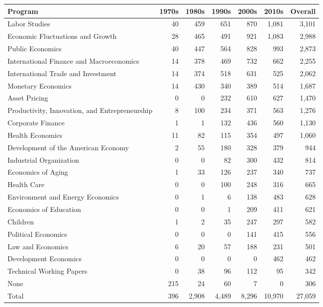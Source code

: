
\begin{tabular}{lrrrrrr}
\toprule
Program & 1970s & 1980s & 1990s & 2000s & 2010s & Overall\\
\midrule
Labor Studies & 40 & 459 & 651 & 870 & 1,081 & 3,101\\
Economic Fluctuations and Growth & 28 & 465 & 491 & 921 & 1,083 & 2,988\\
Public Economics & 40 & 447 & 564 & 828 & 993 & 2,873\\
International Finance and Macroeconomics & 14 & 378 & 469 & 732 & 662 & 2,255\\
International Trade and Investment & 14 & 374 & 518 & 631 & 525 & 2,062\\
Monetary Economics & 14 & 430 & 340 & 389 & 514 & 1,687\\
Asset Pricing & 0 & 0 & 232 & 610 & 627 & 1,470\\
Productivity, Innovation, and Entrepreneurship & 8 & 100 & 234 & 371 & 563 & 1,276\\
Corporate Finance & 1 & 1 & 132 & 436 & 560 & 1,130\\
Health Economics & 11 & 82 & 115 & 354 & 497 & 1,060\\
Development of the American Economy & 2 & 55 & 180 & 328 & 379 & 944\\
Industrial Organization & 0 & 0 & 82 & 300 & 432 & 814\\
Economics of Aging & 1 & 33 & 126 & 237 & 340 & 737\\
Health Care & 0 & 0 & 100 & 248 & 316 & 665\\
Environment and Energy Economics & 0 & 1 & 6 & 138 & 483 & 628\\
Economics of Education & 0 & 0 & 1 & 209 & 411 & 621\\
Children & 1 & 2 & 35 & 247 & 297 & 582\\
Political Economics & 0 & 0 & 0 & 141 & 415 & 556\\
Law and Economics & 6 & 20 & 57 & 188 & 231 & 501\\
Development Economics & 0 & 0 & 0 & 0 & 462 & 462\\
Technical Working Papers & 0 & 38 & 96 & 112 & 95 & 342\\
None & 215 & 24 & 60 & 7 & 0 & 306\\
\midrule
Total & 396 & 2,908 & 4,489 & 8,296 & 10,970 & 27,059\\
\bottomrule
\end{tabular}
